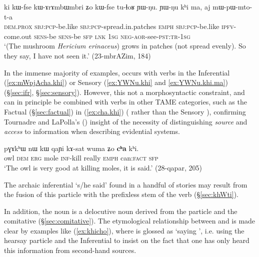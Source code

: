 \begin{exe}
\ex \label{ex:YWNu.khi.ma}
\gll ki kɯ-fse kɯ-ɤrɤmbɯmbri ʑo kɯ-fse tu-ɬoʁ ɲɯ-ŋu. ɲɯ-ŋu kʰi ma, aj mɯ-pɯ-mto-t-a \\
\textsc{dem}.\textsc{prox} \textsc{sbj}:\textsc{pcp}-be.like \textsc{sbj}:\textsc{pcp}-spread.in.patches \textsc{emph} \textsc{sbj}:\textsc{pcp}-be.like \textsc{ipfv}-come.out \textsc{sens}-be \textsc{sens}-be \textsc{sfp} \textsc{lnk} \textsc{1sg} \textsc{neg}-\textsc{aor}-see-\textsc{pst}:\textsc{tr}-\textsc{1sg} \\
\glt `(The mushroom \textit{Hericium erinaceus}) grows in patches (not spread evenly). So they say, I have not seen it.' (23-mbrAZim, 184)
\end{exe}

In the immense majority of examples,  occurs with verbs in the Inferential (\ref{ex:mWpjAcha.khi}) or Sensory (\ref{ex:YWNu.khi} and \ref{ex:YWNu.khi.ma}) (§\ref{sec:ifr}, §\ref{sec:sensory}). However, this not a morphosyntactic constraint, and  can in principle be combined with verbs in other TAME categories, such as the Factual (§\ref{sec:factual}) in (\ref{ex:cha.khi}) ( rather than the Sensory ), confirming Tournadre and LaPolla's (\citeyear{tournadre14evidentiality}) insight of the necessity of distinguishing \textit{source} and \textit{access} to information when describing evidential systems.

\begin{exe}
\ex \label{ex:cha.khi}
\gll pɣɤkʰɯ nɯ kɯ qaɲi kɤ-sat wuma ʑo \textbf{cʰa} kʰi. \\
owl \textsc{dem} \textsc{erg} mole \textsc{inf}-kill really \textsc{emph} can:\textsc{fact} \textsc{sfp} \\
\glt `The owl is very good at killing moles, it is said.' (28-qapar, 205)
\end{exe}

The archaic inferential  `s/he said' found in a handful of stories may result from the fusion of this particle with the prefixless stem of the verb  (§\ref{sec:khWti}).

In addition, the noun  is a delocutive noun derived from the particle  and the comitative  (§\ref{sec:comitative}). The etymological relationship between  and  is made clear by examples like (\ref{ex:khicho}), where  is glossed as `saying ', i.e. using the hearsay particle and the Inferential to insist on the fact that one has only heard this information from second-hand sources.

